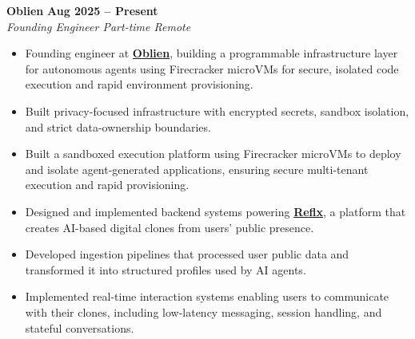 \documentclass[letterpaper, 11pt]{article}
\begin{document}
\textbf{Oblien} \hfill \textbf{Aug 2025 -- Present} \\
\textit{Founding Engineer \textbar{} Part-time Remote}
\begin{itemize}[leftmargin=1.5em, nosep, itemsep=0.15em]
 \item Founding engineer at \href{https://oblien.com/}{\textbf{Oblien}}, building a programmable infrastructure layer for autonomous agents using Firecracker microVMs for secure, isolated code execution and rapid environment provisioning.
  \item Built privacy-focused infrastructure with encrypted secrets, sandbox isolation, and strict data-ownership boundaries.
  \item Built a sandboxed execution platform using Firecracker microVMs to deploy and isolate agent-generated applications, ensuring secure multi-tenant execution and rapid provisioning.
  
    \item Designed and implemented backend systems powering \href{https://reflx.me/}{\textbf{Reflx}}, a platform that creates AI-based digital clones from users' public presence.

  \item Developed ingestion pipelines that processed user public data and transformed it into structured profiles used by AI agents.

  \item Implemented real-time interaction systems enabling users to communicate with their clones, including low-latency messaging, session handling, and stateful conversations.

\end{itemize}
\end{document}
